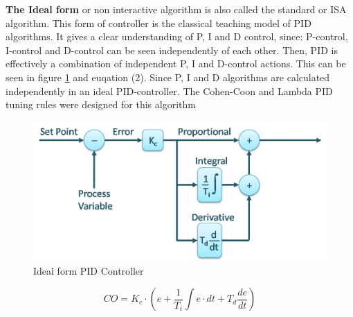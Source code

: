 
\textbf{The Ideal form} or non interactive algorithm is also called the standard or ISA algorithm. This form of controller is the classical teaching model of PID algorithms. It gives a clear understanding of P, I and D control, since: P-control, I-control and D-control can be seen independently of each other. Then, PID is effectively a combination of independent P, I and D-control actions. This can be seen in figure \ref{figure: Ideal PID} and euqation (2).
Since P, I and D algorithms are calculated independently in an ideal PID-controller. The Cohen-Coon and Lambda PID tuning rules were designed for this algorithm

\begin{figure}[H]
	\centering
	\includegraphics[width=0.8\columnwidth]{Pictures/ideal.png}
	\caption[Short title]{Ideal form PID Controller \cite{PID}}
	\label{figure: Ideal PID}
\end{figure}

\begin{equation}
\label{eqn:2}
    CO = K_c\cdot\left(e + \frac{1}{T_i}\int e\cdot dt +T_d\frac{de}{dt} \right)
\end{equation}


